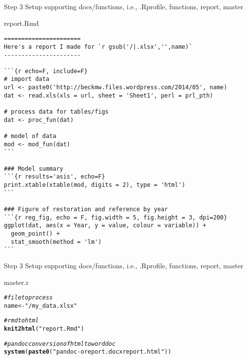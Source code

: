 \documentclass[xcolor=svgnames]{beamer}\usepackage[]{graphicx}\usepackage[]{color}
\makeatletter
\newcommand{\hlstr}[1]{\textcolor[rgb]{0.192,0.494,0.8}{#1}}%
\newcommand{\hlcom}[1]{\textcolor[rgb]{0.678,0.584,0.686}{\textit{#1}}}%
\newcommand{\hlstd}[1]{\textcolor[rgb]{0.345,0.345,0.345}{#1}}%
\newcommand{\hlkwb}[1]{\textcolor[rgb]{0.69,0.353,0.396}{#1}}%
\newcommand{\hlkwd}[1]{\textcolor[rgb]{0.737,0.353,0.396}{\textbf{#1}}}%
\newenvironment{kframe}{%
 \def\at@end@of@kframe{}%
 \ifinner\ifhmode%
  \def\at@end@of@kframe{\end{minipage}}%
  \begin{minipage}{\columnwidth}%
 \fi\fi%
 \def\FrameCommand##1{\hskip\@totalleftmargin \hskip-\fboxsep
 \colorbox{shadecolor}{##1}\hskip-\fboxsep
     \hskip-\linewidth \hskip-\@totalleftmargin \hskip\columnwidth}%
 \MakeFramed {\advance\hsize-\width
   \@totalleftmargin\z@ \linewidth\hsize
   \@setminipage}}%
 {\par\unskip\endMakeFramed%
 \at@end@of@kframe}
\newenvironment{knitrout}{}{} %
\makeatother
\begin{document}
\begin{frame}{Step 3}
Setup supporting docs/functions, i.e., .Rprofile, functions, report, master
\scriptsize
\begin{block}{report.Rmd}
\begin{verbatim}
======================
Here's a report I made for `r gsub('/|.xlsx','',name)`
----------------------

```{r echo=F, include=F}  
# import data
url <- paste0('http://beckmw.files.wordpress.com/2014/05', name)
dat <- read.xls(xls = url, sheet = 'Sheet1', perl = prl_pth)

# process data for tables/figs
dat <- proc_fun(dat)

# model of data
mod <- mod_fun(dat)
```

### Model summary
```{r results='asis', echo=F}
print.xtable(xtable(mod, digits = 2), type = 'html')
```

### Figure of restoration and reference by year
```{r reg_fig, echo = F, fig.width = 5, fig.height = 3, dpi=200}
ggplot(dat, aes(x = Year, y = value, colour = variable)) + 
  geom_point() +
  stat_smooth(method = 'lm')
```
\end{verbatim}
\end{block}
\end{frame}

\begin{frame}[t, fragile]{Step 3}
Setup supporting docs/functions, i.e., .Rprofile, functions, report, master
\scriptsize
\begin{block}{master.r}
\begin{knitrout}
\color{fgcolor}\begin{kframe}
\begin{alltt}
\hlcom{# file to process}
\hlstd{name} \hlkwb{<-} \hlstr{"/my_data.xlsx"}

\hlcom{# rmd to html}
\hlkwd{knit2html}\hlstd{(}\hlstr{"report.Rmd"}\hlstd{)}

\hlcom{# pandoc conversion of html to word doc}
\hlkwd{system}\hlstd{(}\hlkwd{paste0}\hlstd{(}\hlstr{"pandoc -o report.docx report.html"}\hlstd{))}
\end{alltt}
\end{kframe}
\end{knitrout}

\end{block}
\end{frame}
\end{document}
